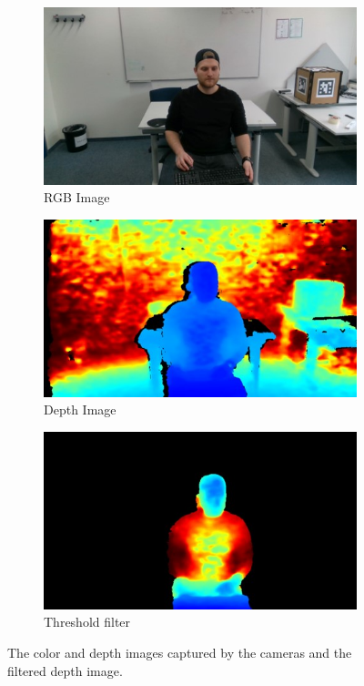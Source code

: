 \documentclass[10pt,twocolumn,letterpaper]{article}
\begin{document}
\begin{figure}
	\centering
	\begin{subfigure}[t]{.315\linewidth}
		\centering\includegraphics[width=0.9\linewidth]{imgs/rgb}
		\caption{RGB Image}
		\label{fig:rgb}
	\end{subfigure}
	\begin{subfigure}[t]{.315\linewidth}
		\centering\includegraphics[width=0.9\linewidth]{imgs/depth}
		\caption{Depth Image}
		\label{fig:depth}
	\end{subfigure}
	\begin{subfigure}[t]{.315\linewidth}
		\centering\includegraphics[width=0.9\linewidth]{imgs/threshold}
		\caption{Threshold filter}
		\label{fig:threshold}
	\end{subfigure}  
	\caption{The color and depth images captured by the \mbox{cameras} and the filtered depth image.}
	\label{fig:rgbd-data}
\end{figure}
\end{document}
